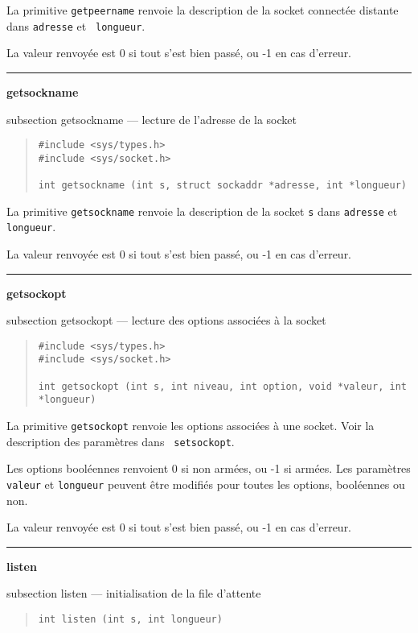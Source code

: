 \documentclass [twoside] {report}
\newcommand {\primitive} [1]
    {
	{\large \bf #1}
	\addcontentsline {toc} {subsection} {#1}
    }
\newcommand {\separation}
    {
	\vspace {7mm}
	\nopagebreak
	\hrule
    }
\begin{document}
La primitive {\tt getpeername} renvoie la description de la
socket connectée distante dans {\tt adresse} et {\tt
longueur}.

La valeur renvoyée est 0 si tout s'est bien passé, ou -1 en
cas d'erreur.



\separation
\primitive {getsockname} --- lecture de l'adresse de la socket

\begin {quote}
\begin {verbatim}
#include <sys/types.h>
#include <sys/socket.h>

int getsockname (int s, struct sockaddr *adresse, int *longueur)
\end{verbatim}
\end {quote}

La primitive {\tt getsockname} renvoie la description de la
socket {\tt s} dans {\tt adresse} et {\tt longueur}.

La valeur renvoyée est 0 si tout s'est bien passé, ou -1 en
cas d'erreur.



\separation
\primitive {getsockopt} --- lecture des options associées à la socket

\begin {quote}
\begin {verbatim}
#include <sys/types.h>
#include <sys/socket.h>

int getsockopt (int s, int niveau, int option, void *valeur, int *longueur)
\end{verbatim}
\end {quote}

La primitive {\tt getsockopt} renvoie les options associées à
une socket. Voir la description des paramètres dans {\tt
setsockopt}.

Les options booléennes renvoient 0 si non armées, ou -1 si
armées. Les paramètres {\tt valeur} et {\tt longueur}
peuvent être modifiés pour toutes les options, booléennes ou
non.

La valeur renvoyée est 0 si tout s'est bien passé, ou -1 en
cas d'erreur.



\separation
\primitive {listen} --- initialisation de la file d'attente

\begin {quote}
\begin {verbatim}
int listen (int s, int longueur)
\end{verbatim}
\end {quote}
\end{document}
